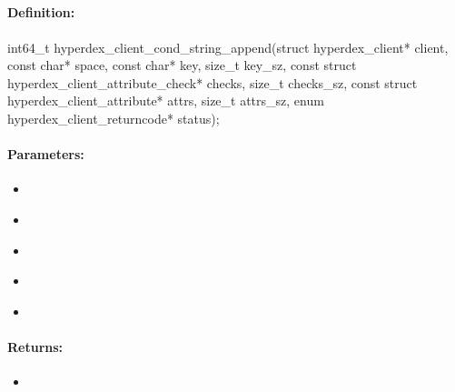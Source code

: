 \pagebreak
\subsection{}
\label{api:c:cond_string_append}


\paragraph{Definition:}
\begin{ccode}
int64_t hyperdex_client_cond_string_append(struct hyperdex_client* client,
        const char* space,
        const char* key, size_t key_sz,
        const struct hyperdex_client_attribute_check* checks, size_t checks_sz,
        const struct hyperdex_client_attribute* attrs, size_t attrs_sz,
        enum hyperdex_client_returncode* status);
\end{ccode}

\paragraph{Parameters:}
\begin{itemize}[noitemsep]
\item {}\\

\item {}\\

\item {}\\

\item {}\\

\item {}\\

\end{itemize}

\paragraph{Returns:}
\begin{itemize}[noitemsep]
\item {}\\

\end{itemize}

